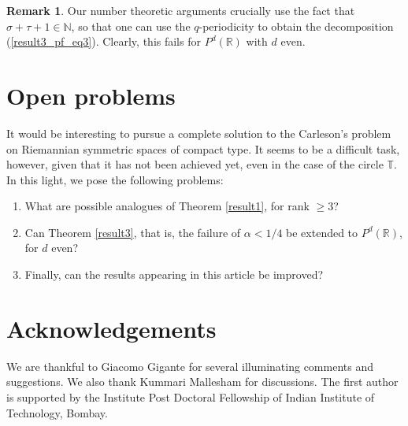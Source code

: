 \documentclass[12pt]{amsart}
\theoremstyle{definition}
\newtheorem{remark}[theorem]{Remark}
\newcommand{\R}{\mathbb R}%
\newcommand{\N}{\mathbb N}%
\newcommand{\T}{\mathbb T}%
\numberwithin{equation}{section}
\begin{document}
\begin{remark} \label{remark_failure_result3}
Our number theoretic arguments crucially use the fact that $\sigma + \tau +1 \in \N$, so that one can use the $q$-periodicity to obtain the decomposition (\ref{result3_pf_eq3}). Clearly, this fails for $P^d(\R)$ with $d$ even.  
\end{remark}



\section{Open problems}
It would be interesting to pursue a complete solution to the Carleson's problem on Riemannian symmetric spaces of compact type. It seems to be a difficult task, however, given that it has not been achieved yet, even in the case of the circle $\T$. In this light, we pose the following problems:
\begin{enumerate}
\item What are possible analogues of Theorem \ref{result1}, for rank $\ge 3$?
\item Can Theorem \ref{result3}, that is, the failure of $\alpha <1/4$ be extended to $P^d(\R)$, for $d$ even?
\item Finally, can the results appearing in this article be improved?
\end{enumerate} 




\section*{Acknowledgements} We are thankful to Giacomo Gigante for several illuminating comments and suggestions. We also thank Kummari Mallesham for discussions. The first author is supported by the Institute Post Doctoral Fellowship of Indian Institute of Technology, Bombay.


\end{document}
